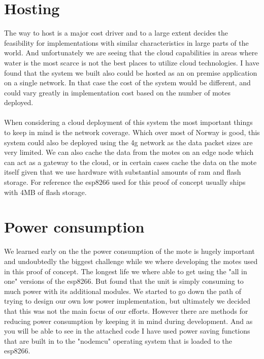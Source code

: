 \documentclass[]{uiophd}
\begin{document}
\section{Hosting}
The way to host is a major cost driver and to a large extent decides the feasibility for implementations with similar characteristics in large parts of the world. And unfortunately we are seeing that the cloud capabilities in areas where water is the most scarce is not the best places to utilize cloud technologies. I have found that the system we built also could be hosted as an on premise application on a single network. In that case the cost of the system would be different, and could vary greatly in implementation cost based on the number of motes deployed.
\\\\
When considering a cloud deployment of this system the most important things to keep in mind is the network coverage. Which over most of Norway is good, this system could also be deployed using the 4g network as the data packet sizes are very limited. We can also cache the data from the motes on an edge node which can act as a gateway to the cloud, or in certain cases cache the data on the mote itself given that we use hardware with substantial amounts of ram and flash storage. For reference the esp8266 used for this proof of concept usually ships with 4MB of flash storage. \parencite{espressif}
\section{Power consumption}
We learned early on the the power consumption of the mote is hugely important and undoubtedly the biggest challenge while we where developing the motes used in this proof of concept. The longest life we where able to get using the "all in one" versions of the esp8266. But found that the unit is simply consuming to much power with its additional modules. We started to go down the path of trying to design our own low power implementation, but ultimately we decided that this was not the main focus of our efforts. However there are methods for reducing power consumption by keeping it in mind during development. And as you will be able to see in the attached code I have used  power saving functions that are built in to the "nodemcu" operating system that is loaded to the esp8266.
\end{document}
